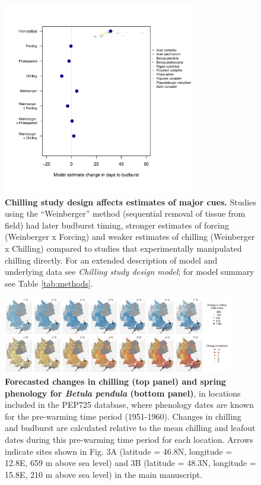 \documentclass{article}
\begin{document}
\begin{figure}[h!]
\centering
\noindent \includegraphics[width=0.75\textwidth]{..//..//analyses/figures/weinberger_MU_4supp.pdf}
\caption{\textbf{Chilling study design affects estimates of major cues.} Studies using the ``Weinberger'' method (sequential removal of tissue from field) had later budburst timing, stronger estimates of forcing (Weinberger x Forcing) and weaker estimates of chilling (Weinberger x Chilling) compared to studies that experimentally manipulated chilling directly. For an extended description of model and underlying data see \emph{Chilling study design model}; for model summary see Table \ref{tab:methods}.}
\label{fig:weinberger}
\end{figure}

\begin{figure}[h!]
\centering
\noindent \includegraphics[width=0.90\textwidth]{..//..//analyses/bb_analysis/figures/forecasting/heatmapsbetpepfinalarrows.png}
\caption{\textbf{Forecasted changes in chilling (top panel) and spring phenology for \emph{Betula pendula} (bottom panel)}, in locations included in the PEP725 database, where phenology dates are known for the pre-warming time period (1951-1960). Changes in chilling and budburst are calculated relative to the mean chilling and leafout dates during this pre-warming time period for each location. Arrows indicate sites shown in Fig. 3A (latitude = 46.8\degree N, longitude =  12.8\degree E, 659 m above sea level) and 3B (latitude = 48.3\degree N, longitude =  15.8\degree E, 210 m above sea level) in the main manuscript.} 
\label{fig:foremap}
\end{figure}
\end{document}
